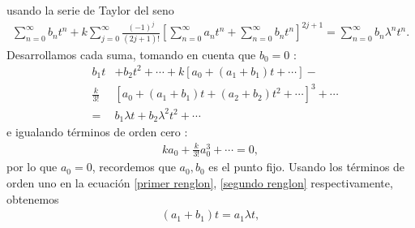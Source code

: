 usando la serie de Taylor del seno
\begin{eqnarray}
\sum_{n=0}^{\infty}b_{n}t^{n} +k\sum_{j=0}^{\infty}\frac{(-1)^{j}}{(2j+1)!}\left[ \sum_{n=0}^{\infty}a_{n}t^{n} +\sum_{n=0}^{\infty}b_{n}t^{n}\right]^{2j+1}=\sum_{n=0}^{\infty}b_{n}\lambda^{n}t^{n}.
\label{seno exapandido 2}
\end{eqnarray}
Desarrollamos cada suma, tomando en cuenta que $b_{0}=0$ :
\begin{eqnarray}
&b_{1}t&+b_{2}t^{2}+\cdots+k\left[a_{0}+(a_{1}+b_{1})t+\cdots\right]-\nonumber\\
&\frac{k}{3!}&\left[a_{0}+(a_{1}+b_{1})t+(a_{2}+b_{2})t^{2}+\cdots\right]^{3}+\cdots\nonumber\\
&=&b_{1}\lambda t+b_{2}\lambda^{2}t^{2}+\cdots
\label{segundo renglon}
\end{eqnarray}
e igualando términos de orden cero :
\begin{eqnarray}
k a_{0}+\frac{k}{3!}a_{0}^{3}+\cdots=0, 
\end{eqnarray}
por lo que $a_{0}=0$, recordemos que $a_{0},b_{0}$ es el punto fijo. Usando los términos de orden uno en la ecuación \eqref{primer renglon}, \eqref{segundo renglon} respectivamente, obtenemos
\begin{eqnarray}
(a_{1}+b_{1})t=a_{1}\lambda t,
\end{eqnarray}

